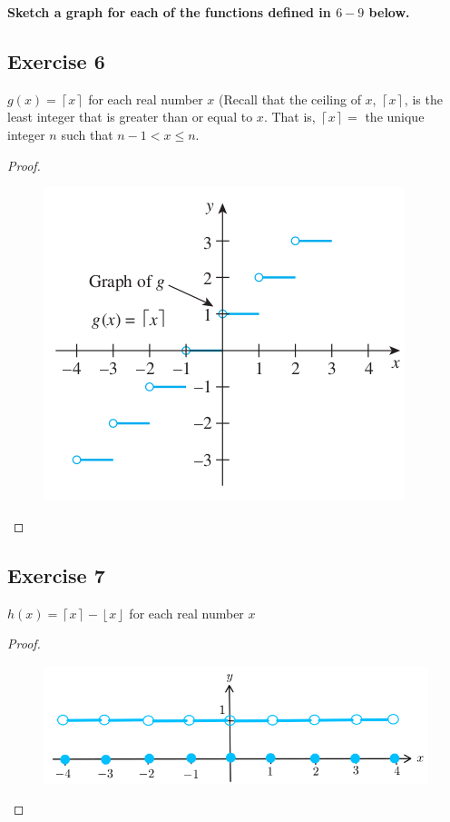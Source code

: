 \documentclass[14pt]{extarticle}
\newcommand{\cy}{\color{cyan}}
\newcommand{\floor}[1]{{\left\lfloor#1\right\rfloor}}
\newcommand{\ceil}[1]{{\left\lceil#1\right\rceil}}
\begin{document}
{\bf \cy Sketch a graph for each of the functions defined in \(6-9\) below.}

\subsection{Exercise 6}
\(g(x) = \ceil{x}\) for each real number \(x\) (Recall that the ceiling of \(x\), \(\ceil{x}\), is the least integer that
is greater than or equal to \(x\). That is, \(\ceil{x} =\) the unique integer \(n\) such that \(n-1 < x \leq n\).

\begin{proof}
    \begin{figure}[ht!]
        \centering
        \includegraphics[scale=0.5]{../images/11.1.6.png}
    \end{figure}
\end{proof}

\subsection{Exercise 7}
\(h(x) = \ceil{x} - \floor{x}\) for each real number \(x\)

\begin{proof}
    \begin{figure}[ht!]
        \centering
        \includegraphics[scale=0.5]{../images/11.1.7.png}
    \end{figure}
\end{proof}
\end{document}
